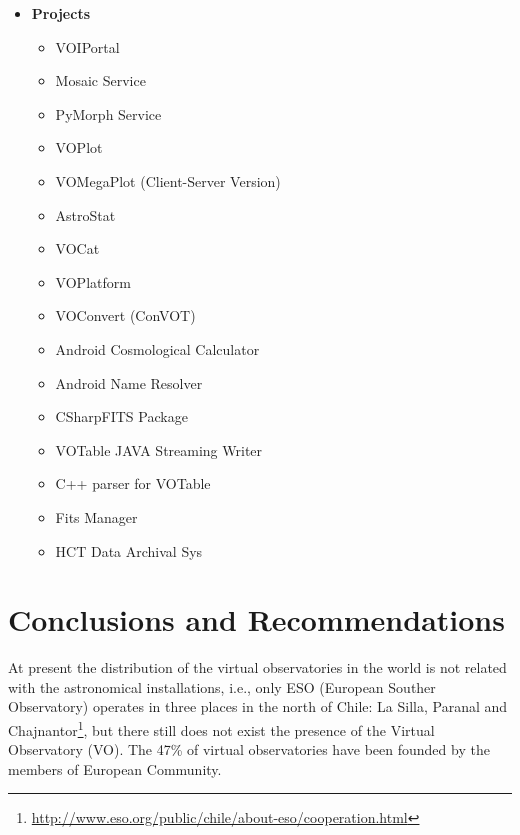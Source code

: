 \documentclass[11pt]{article}
\begin{document}
                \begin{itemize}
                    \item \textbf{Projects}
                        \begin{itemize}
                            \item VOIPortal
                            \item Mosaic Service
                            \item PyMorph Service
                            \item VOPlot
                            \item VOMegaPlot (Client-Server Version)
                            \item AstroStat
                            \item VOCat
                            \item VOPlatform
                            \item VOConvert (ConVOT)
                            \item Android Cosmological Calculator
                            \item Android Name Resolver
                            \item CSharpFITS Package
                            \item VOTable JAVA Streaming Writer
                            \item C++ parser for VOTable
                            \item Fits Manager
                            \item HCT Data Archival Sys
                        \end{itemize}   
                \end{itemize}

    \newpage
    
    \section{Conclusions and Recommendations}
        At present the distribution of the virtual observatories in the world is
not related with the astronomical installations, i.e., only ESO (European
Souther Observatory) operates in three places in the north of Chile: La Silla,
Paranal and
Chajnantor\footnote{\url{http://www.eso.org/public/chile/about-eso/cooperation.html}},
but there still does not exist the presence of the Virtual Observatory (VO). The
47\% of virtual observatories have been founded by the members of European
Community.\\
\end{document}
